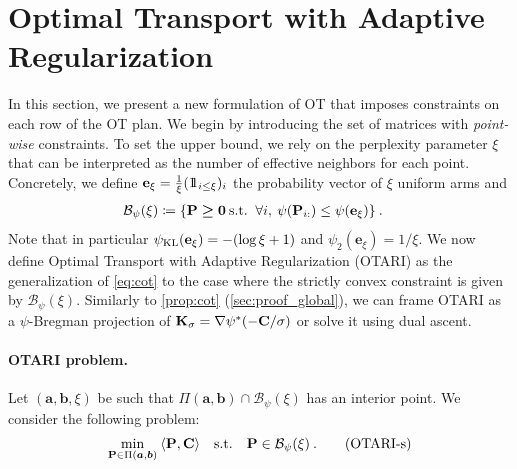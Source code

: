 

\section{Optimal Transport with Adaptive Regularization}\label{sec:pwot}

In this section, we present a new formulation of OT that imposes constraints on each row of the OT plan.
We begin by introducing the set of matrices with \emph{point-wise} constraints. To set the upper bound, we rely on the perplexity parameter $\xi$ \citep{van2023snekhorn} that can be interpreted as the number of effective neighbors for each point. Concretely, we define $\mathbf{e}_{\xi} = \frac{1}{\xi}(1\!\!1_{i \leq \xi})_{i}$ the probability vector of $\xi$ uniform arms and
\begin{align}
  \mathcal{B}_\psi(\xi) &\coloneqq \{{\mathbf{P}} \bm{\geq} \bm{0} \: \text{s.t.}\ \: \forall i, \: \psi({\mathbf{P}}_{i:}) \leq \psi(\mathbf{e}_{\xi}) \} \:.
\end{align}
Note that in particular $\psi_{\operatorname{KL}}(\mathbf{e}_{\xi}) = - (\log \xi + 1)$ and $\psi_2(\mathbf{e}_{\xi}) = 1/\xi$.
We now define Optimal Transport with Adaptive Regularization (OTARI) as the generalization of \eqref{eq:cot} to the case where the strictly convex constraint is given by $\mathcal{B}_\psi(\xi)$. Similarly to \cref{prop:cot} (\cref{sec:proof_global}), we can frame OTARI as a $\psi$-Bregman projection of ${\mathbf{K}}_\sigma = \nabla \psi^*(-{\mathbf{C}} / \sigma)$ or solve it using dual ascent.

\paragraph{OTARI problem.}
  Let $(\bm{a}, \bm{b}, \xi)$ be such that $\Pi(\bm{a}, \bm{b}) \cap \mathcal{B}_\psi(\xi)$ has an interior point.
  We consider the following problem:
  \begin{align}\label{eq:pcOT}
    \min_{{\mathbf{P}} \in \Pi(\bm{a}, \bm{b})} \: \langle {\mathbf{P}}, {\mathbf{C}} \rangle \quad \text{s.t.} \quad  {\mathbf{P}} \in \mathcal{B}_\psi(\xi) \:.
    \tag{OTARI-s}
\end{align}

